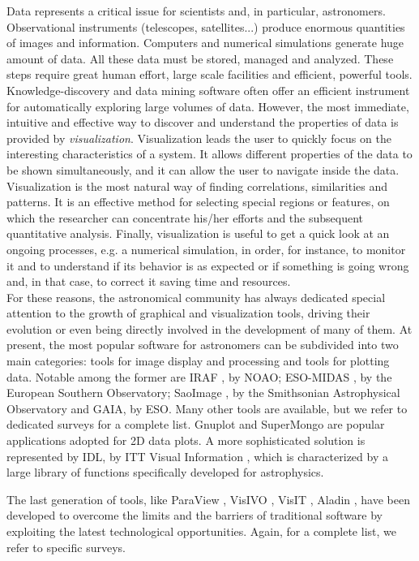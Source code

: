 Data represents a critical issue for scientists and, in particular, astronomers. 
Observational instruments (telescopes, satellites...) produce enormous quantities of images and information. 
Computers and numerical simulations generate huge amount of data. All these data must be stored, 
managed and analyzed. These steps require great human effort, large scale facilities and efficient, powerful tools.  
Knowledge-discovery and data mining software often offer an efficient
instrument for automatically exploring large volumes of data. However, the most immediate,
intuitive and effective way to discover and understand the properties of data
is provided by {\it visualization}. Visualization leads the user to quickly
focus on the interesting characteristics of a system. It allows
 different properties of the data to be shown simultaneously, and it can allow the user 
to navigate inside the data. Visualization is the most natural way of finding correlations, 
similarities and patterns. It is an effective method for
selecting special regions or features, on which the researcher can concentrate his/her
efforts and the subsequent quantitative analysis. Finally, visualization is 
useful to get a quick look at an ongoing processes, e.g. a numerical simulation, 
in order, for instance, to monitor it and to understand if its behavior is as expected or if
something is going wrong and, in that case, to correct it saving time and resources.\\
For these reasons, the astronomical community has always dedicated special
attention to the growth of graphical and visualization tools, driving their evolution or even being
directly involved in the development of many of them.
At present, the most popular software for astronomers can be subdivided
into two main categories: tools for image display and processing and tools for
plotting data. Notable among the former are IRAF \cite{iraf}, by NOAO; ESO-MIDAS \cite{midas}, by the 
European Southern Observatory; SaoImage \cite{sao}, by the Smithsonian Astrophysical Observatory and
GAIA, by ESO. Many other tools are available, but we refer to dedicated surveys
for a complete list. Gnuplot and SuperMongo are 
popular applications adopted for 2D data plots. A more sophisticated solution 
is represented by IDL, by ITT Visual Information \cite{idl}, which is characterized
by a large library of functions specifically developed for astrophysics. 

The last generation 
of tools, like ParaView \cite{paraview}, VisIVO \cite{visivo}, VisIT \cite{visit}, Aladin
\cite{aladin}, have been developed to overcome the limits
and the barriers of traditional software by exploiting the latest technological 
opportunities. Again, for a complete list, we refer to specific surveys. 

